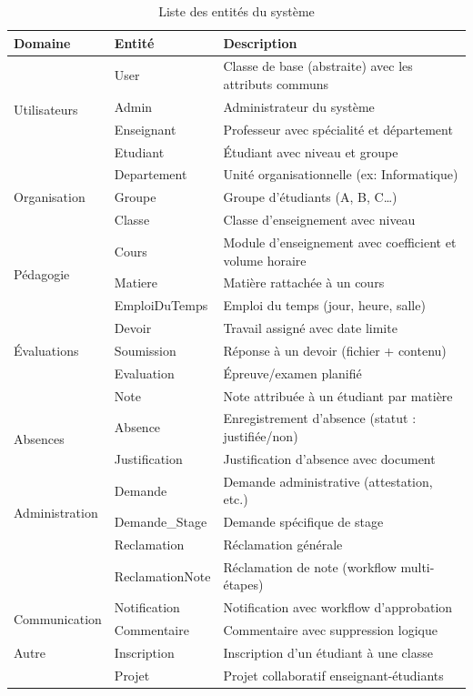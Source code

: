 \begin{table}[H]
\centering
\caption{Liste des entités du système}
\label{tab:entites}
\begin{tabularx}{\textwidth}{llX}
\toprule
\textbf{Domaine} & \textbf{Entité} & \textbf{Description} \\
\midrule
\multirow{4}{*}{Utilisateurs} 
 & User & Classe de base (abstraite) avec les attributs communs \\
 & Admin & Administrateur du système \\
 & Enseignant & Professeur avec spécialité et département \\
 & Etudiant & Étudiant avec niveau et groupe \\
\midrule
\multirow{3}{*}{Organisation}
 & Departement & Unité organisationnelle (ex: Informatique) \\
 & Groupe & Groupe d'étudiants (A, B, C…) \\
 & Classe & Classe d'enseignement avec niveau \\
\midrule
\multirow{3}{*}{Pédagogie}
 & Cours & Module d'enseignement avec coefficient et volume horaire \\
 & Matiere & Matière rattachée à un cours \\
 & EmploiDuTemps & Emploi du temps (jour, heure, salle) \\
\midrule
\multirow{3}{*}{Évaluations}
 & Devoir & Travail assigné avec date limite \\
 & Soumission & Réponse à un devoir (fichier + contenu) \\
 & Evaluation & Épreuve/examen planifié \\
 & Note & Note attribuée à un étudiant par matière \\
\midrule
\multirow{2}{*}{Absences}
 & Absence & Enregistrement d'absence (statut : justifiée/non) \\
 & Justification & Justification d'absence avec document \\
\midrule
\multirow{3}{*}{Administration}
 & Demande & Demande administrative (attestation, etc.) \\
 & Demande\_Stage & Demande spécifique de stage \\
 & Reclamation & Réclamation générale \\
 & ReclamationNote & Réclamation de note (workflow multi-étapes) \\
\midrule
\multirow{2}{*}{Communication}
 & Notification & Notification avec workflow d'approbation \\
 & Commentaire & Commentaire avec suppression logique \\
\midrule
Autre
 & Inscription & Inscription d'un étudiant à une classe \\
 & Projet & Projet collaboratif enseignant-étudiants \\
\bottomrule
\end{tabularx}
\end{table}

